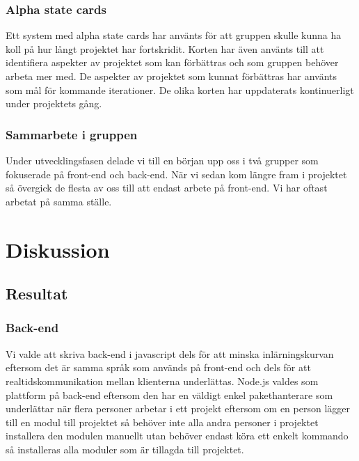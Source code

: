 \documentclass{article}
\begin{document}
\subsubsection{Alpha state cards}
Ett system med alpha state cards har använts för att gruppen skulle kunna ha koll på hur långt projektet har fortskridit. Korten har även använts till att identifiera aspekter av projektet som kan förbättras och som gruppen behöver arbeta mer med. De aspekter av projektet som kunnat förbättras har använts som mål för kommande iterationer. De olika korten har uppdaterats kontinuerligt under projektets gång.

\subsubsection{Sammarbete i gruppen}
Under utvecklingsfasen delade vi till en början upp oss i två grupper som fokuserade på front-end och back-end. När vi sedan kom längre fram i projektet så övergick de flesta av oss till att endast arbete på front-end. Vi har oftast arbetat på samma ställe.


\clearpage

\clearpage

\section{Diskussion}

\subsection{Resultat}

\subsubsection{Back-end}
Vi valde att skriva back-end i javascript dels för att minska inlärningskurvan eftersom det är samma språk som används på front-end och dels för att realtidskommunikation mellan klienterna underlättas. Node.js valdes som plattform på back-end eftersom den har en väldigt enkel pakethanterare som underlättar när flera personer arbetar i ett projekt eftersom om en person lägger till en modul till projektet så behöver inte alla andra personer i projektet installera den modulen manuellt utan behöver endast köra ett enkelt kommando så installeras alla moduler som är tillagda till projektet.
\end{document}
